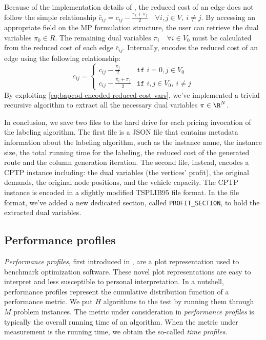 Because of the implementation details of \bapcod{},
the reduced cost of an edge does not follow the simple relationship
$\bar{c}_{ij} = c_{ij} - \frac{\pi_i + \pi_j}{2} \quad \forall i, j \in V,\ i \ne j$.
By accessing an appropriate field on the MP formulation structure,
the user can retrieve the dual variables $\pi_0 \in R$.
The remaining dual variables $\pi_i \quad \forall i \in V_0$
must be calculated from the reduced cost of each edge $\bar{c}_{ij}$.
Internally, \bapcod{} encodes the reduced cost of an edge using the following relationship:
\begin{equation}
	\bar{c}_{ij} = \begin{cases}
		c_{ij} - \frac{\pi_{j}}{2}       & \texttt{if } i = 0, j \in V_0       \\
		c_{ij} - \frac{\pi_i + \pi_j}{2} & \texttt{if } i, j \in V_0,\ i \ne j
	\end{cases}
	\label{eq:bapcod-encoded-reduced-cost-vars}
\end{equation}
By exploiting \cref{eq:bapcod-encoded-reduced-cost-vars},
we've implemented a trivial recursive algorithm
to extract all the necessary dual variables $\pi \in \R^N$.

In conclusion, we save two files to the hard drive for each pricing invocation of the labeling algorithm.
The first file is a JSON file that contains metadata information about
the labeling algorithm, such as the instance name, the instance size,
the total running time for the labeling, the reduced cost of the generated route
and the column generation iteration.
The second file, instead, encodes a CPTP instance including:
the dual variables (the vertices' profit),
the original demands, the original node positions, and the vehicle capacity.
The CPTP instance is encoded in a slightly modified TSPLIB95 file format.
In the file format, we've added a new dedicated section, called \texttt{PROFIT\_SECTION},
to hold the extracted dual variables.

\subsection{Performance profiles}
\label{sec:results-performance-profiles}

\textit{Performance profiles}, first introduced in \textcite{dolan2002},
are a plot representation used to benchmark optimization software.
These novel plot representations are easy to interpret and less susceptible to personal interpretation.
In a nutshell, performance profiles represent the cumulative distribution function of a performance metric.
We put $H$ algorithms to the test by running them through $M$ problem instances.
The metric under consideration in \textit{performance profiles}
is typically the overall running time of an algorithm.
When the metric under measurement is the running time, we obtain the so-called \textit{time profiles}.

